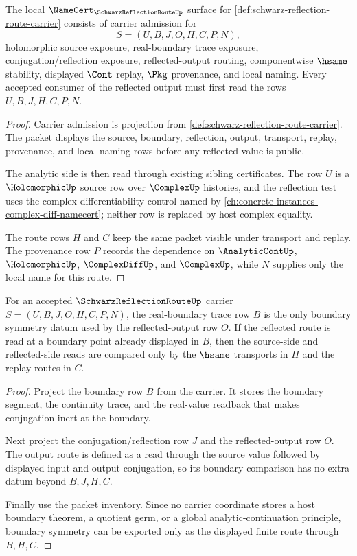 \begin{theorem}
\label{thm:schwarz-reflection-route-namecert-obligations}
The local $\NameCert_{\SchwarzReflectionRouteUp}$ surface for \autoref{def:schwarz-reflection-route-carrier} consists of carrier admission for
$$
S=(U,B,J,O,H,C,P,N),
$$
holomorphic source exposure, real-boundary trace exposure, conjugation/reflection exposure, reflected-output routing, componentwise $\hsame$ stability, displayed $\Cont$ replay, $\Pkg$ provenance, and local naming. Every accepted consumer of the reflected output must first read the rows $U,B,J,H,C,P,N$.
\end{theorem}
\begin{proof}
Carrier admission is projection from \autoref{def:schwarz-reflection-route-carrier}. The packet displays the source, boundary, reflection, output, transport, replay, provenance, and local naming rows before any reflected value is public.

The analytic side is then read through existing sibling certificates. The row $U$ is a $\HolomorphicUp$ source row over $\ComplexUp$ histories, and the reflection test uses the complex-differentiability control named by \autoref{ch:concrete-instances-complex-diff-namecert}; neither row is replaced by host complex equality.

The route rows $H$ and $C$ keep the same packet visible under transport and replay. The provenance row $P$ records the dependence on $\AnalyticContUp$, $\HolomorphicUp$, $\ComplexDiffUp$, and $\ComplexUp$, while $N$ supplies only the local name for this route.
\end{proof}

\begin{theorem}
\label{thm:schwarz-reflection-route-boundary-symmetry}
For an accepted $\SchwarzReflectionRouteUp$ carrier $S=(U,B,J,O,H,C,P,N)$, the real-boundary trace row $B$ is the only boundary symmetry datum used by the reflected-output row $O$. If the reflected route is read at a boundary point already displayed in $B$, then the source-side and reflected-side reads are compared only by the $\hsame$ transports in $H$ and the replay routes in $C$.
\end{theorem}
\begin{proof}
Project the boundary row $B$ from the carrier. It stores the boundary segment, the continuity trace, and the real-value readback that makes conjugation inert at the boundary.

Next project the conjugation/reflection row $J$ and the reflected-output row $O$. The output route is defined as a read through the source value followed by displayed input and output conjugation, so its boundary comparison has no extra datum beyond $B,J,H,C$.

Finally use the packet inventory. Since no carrier coordinate stores a host boundary theorem, a quotient germ, or a global analytic-continuation principle, boundary symmetry can be exported only as the displayed finite route through $B,H,C$.
\end{proof}

